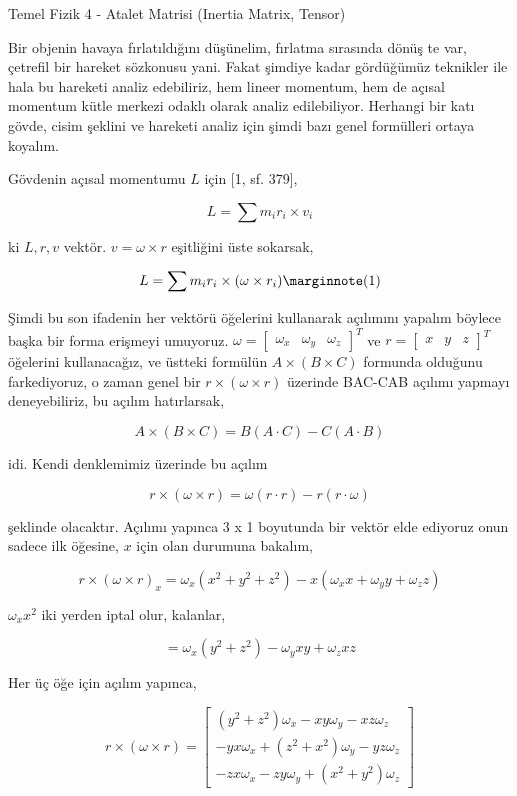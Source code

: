 \documentclass[12pt,fleqn]{article}\usepackage{../../common}
\begin{document}
Temel Fizik 4 - Atalet Matrisi (Inertia Matrix, Tensor)

Bir objenin havaya fırlatıldığını düşünelim, fırlatma sırasında dönüş te var,
çetrefil bir hareket sözkonusu yani. Fakat şimdiye kadar gördüğümüz teknikler
ile hala bu hareketi analiz edebiliriz, hem lineer momentum, hem de açısal
momentum kütle merkezi odaklı olarak analiz edilebiliyor. Herhangi bir katı
gövde, cisim şeklini ve hareketi analiz için şimdi bazı genel formülleri
ortaya koyalım. 

Gövdenin açısal momentumu $L$ için [1, sf. 379],

$$
L = \sum m_i r_i \times v_i
$$

ki $L,r,v$ vektör. $v = \omega \times r$ eşitliğini üste sokarsak,

$$
L = \sum m_i r_i \times (\omega \times r_i)
\mlabel{1}
$$

Şimdi bu son ifadenin her vektörü öğelerini kullanarak açılımını yapalım böylece
başka bir forma erişmeyi umuyoruz. $\omega = [\begin{array}{ccc} \omega_x&\omega_y&\omega_z \end{array}]^T$
ve $r = [\begin{array}{ccc} x&y&z \end{array}]^T$ öğelerini kullanacağız, ve
üstteki formülün $A \times (B \times C)$ formunda olduğunu farkediyoruz, o zaman
genel bir $r \times (\omega \times r)$ üzerinde BAC-CAB açılımı yapmayı
deneyebiliriz, bu açılım hatırlarsak,

$$
A \times (B \times C) = B(A \cdot C) - C(A \cdot B)
$$

idi. Kendi denklemimiz üzerinde bu açılım

$$
r \times (\omega \times r) = \omega (r \cdot r) - r(r \cdot \omega)
$$

şeklinde olacaktır. Açılımı yapınca 3 x 1 boyutunda bir vektör elde ediyoruz
onun sadece ilk öğesine, $x$ için olan durumuna bakalım,

$$
r \times (\omega \times r)_x = \omega_x (x^2 + y^2 + z^2) - x(\omega_x x + \omega_y y + \omega_z z)
$$

$\omega_x x^2$ iki yerden iptal olur, kalanlar,

$$
 = \omega_x ( y^2 + z^2) - \omega_y xy + \omega_z xz
$$

Her üç öğe için açılım yapınca,

$$
r \times (\omega \times r) =
\left[\begin{array}{c}
(y^2 + z^2) \omega_x - xy \omega_y - xz \omega_z \\
-yx \omega_x + (z^2 + x^2)\omega_y - yz \omega_z \\    
-zx \omega_x - zy \omega_y + (x^2+y^2)\omega_z
\end{array}\right]
$$
\end{document}
